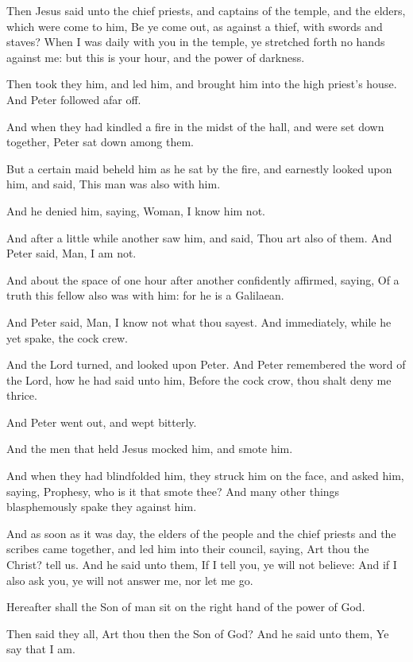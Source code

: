 \verse Then Jesus said unto the chief priests, and captains of the temple, and the elders, which were come to him, Be ye come out, as against a thief, with swords and staves?  \verse When I was daily with you in the temple, ye stretched forth no hands against me: but this is your hour, and the power of darkness.

\verse Then took they him, and led him, and brought him into the high priest's house. And Peter followed afar off.

\verse And when they had kindled a fire in the midst of the hall, and were set down together, Peter sat down among them.

\verse But a certain maid beheld him as he sat by the fire, and earnestly looked upon him, and said, This man was also with him.

\verse And he denied him, saying, Woman, I know him not.

\verse And after a little while another saw him, and said, Thou art also of them. And Peter said, Man, I am not.

\verse And about the space of one hour after another confidently affirmed, saying, Of a truth this fellow also was with him: for he is a Galilaean.

\verse And Peter said, Man, I know not what thou sayest. And immediately, while he yet spake, the cock crew.

\verse And the Lord turned, and looked upon Peter. And Peter remembered the word of the Lord, how he had said unto him, Before the cock crow, thou shalt deny me thrice.

\verse And Peter went out, and wept bitterly.

\verse And the men that held Jesus mocked him, and smote him.

\verse And when they had blindfolded him, they struck him on the face, and asked him, saying, Prophesy, who is it that smote thee?  \verse And many other things blasphemously spake they against him.

\verse And as soon as it was day, the elders of the people and the chief priests and the scribes came together, and led him into their council, saying, \verse Art thou the Christ? tell us. And he said unto them, If I tell you, ye will not believe: \verse And if I also ask you, ye will not answer me, nor let me go.

\verse Hereafter shall the Son of man sit on the right hand of the power of God.

\verse Then said they all, Art thou then the Son of God? And he said unto them, Ye say that I am.

